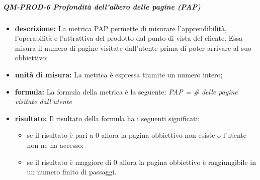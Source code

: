 			\subparagraph{QM-PROD-6 Profondità dell'albero delle pagine (PAP)}
			\begin{itemize}
      			\item \textbf{descrizione: }
					La metrica PAP permette di misurare l'apprendibilità, l'operabilità e l'attrattiva del prodotto dal punto di vista del cliente. Essa misura il numero di pagine visitate dall'utente prima di poter arrivare al suo obbiettivo;
				\item \textbf{unità di misura: }
					La metrica è espressa tramite un numero intero;
				\item \textbf{formula: }
					La formula della metrica è la seguente:
					\textit{PAP = \# delle pagine visitate dall'utente}
				\item \textbf{risultato: }
					Il risultato della formula ha i seguenti significati:
					\begin{itemize}
						\item se il risultato è pari a 0 allora la pagina obbiettivo non esiste o l'utente non ne ha accesso;
						\item se il risultato è maggiore di 0 allora la pagina obbiettivo è raggiungibile in un numero finito di passaggi.
					\end{itemize}
			\end{itemize}
